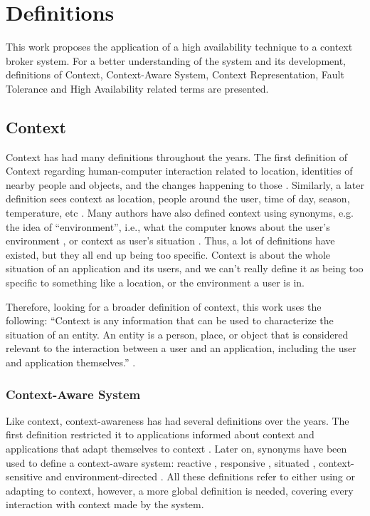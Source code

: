 \chapter{Definitions}
\label{chap:definitions}
This work proposes the application of a high availability technique to a context broker system. For a better understanding of the system and its development, definitions of Context, Context-Aware System, Context Representation, Fault Tolerance and High Availability related terms are presented.

\section{Context}
\label{sec:context}

Context has had many definitions throughout the years. The first definition of Context regarding human-computer interaction related to location, identities of nearby people and objects, and the changes happening to those \cite{schilit1994disseminating}.  Similarly, a later definition sees context as location, people around the user, time of day, season, temperature, etc \cite{brown1997context}. Many authors have also defined context using synonyms, e.g. the idea of “environment”, i.e., what the computer knows about the user's environment \cite{brown1995stick}, or context as user's situation \cite{franklin1998all}. Thus, a lot of definitions have existed, but they all end up being too specific. Context is about the whole situation of an application and its users, and we can't really define it as being too specific to something like a location, or the environment a user is in.

Therefore, looking for a broader definition of context, this work uses the following: ``Context is any information that can be used to characterize the situation of an entity. An entity is a person, place, or object that is considered relevant to the interaction between a user and an application, including the user and application themselves.'' \cite{dey2000providing}.

\subsection{Context-Aware System}
Like context, context-awareness has had several definitions over the years. The first definition restricted it to applications informed about context and applications that adapt themselves to context \cite{schilit1994disseminating}. Later on, synonyms have been used to define a context-aware system: reactive \cite{cooperstock1995evolution}, responsive \cite{elrod1993responsive}, situated \cite{hull1997towards}, context-sensitive \cite{rekimoto1998augment} and environment-directed \cite{fickas1997software}. All these definitions refer to either using or adapting to context, however, a more global definition is needed, covering every interaction with context made by the system.

